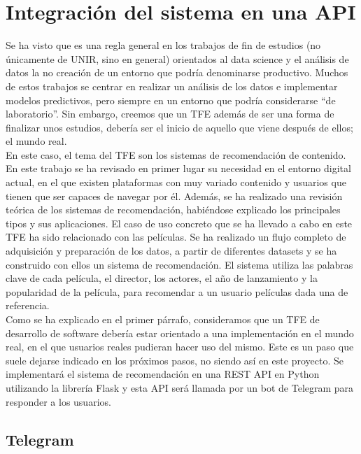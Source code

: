 \chapter{Integración del sistema en una API}\label{chap:api}

Se ha visto que es una regla general en los trabajos de fin de estudios (no únicamente de UNIR, sino en general) orientados al data science y el análisis de datos la no creación de un entorno que podría denominarse productivo. Muchos de estos trabajos se centrar en realizar un análisis de los datos e implementar modelos predictivos, pero siempre en un entorno que podría considerarse ``de laboratorio''. Sin embargo, creemos que un TFE además de ser una forma de finalizar unos estudios, debería ser el inicio de aquello que viene después de ellos; el mundo real.\\

En este caso, el tema del TFE son los sistemas de recomendación de contenido. En este trabajo se ha revisado en primer lugar su necesidad en el entorno digital actual, en el que existen plataformas con muy variado contenido y usuarios que tienen que ser capaces de navegar por él. Además, se ha realizado una revisión teórica de los sistemas de recomendación, habiéndose explicado los principales tipos y sus aplicaciones. El caso de uso concreto que se ha llevado a cabo en este TFE ha sido relacionado con las películas. Se ha realizado un flujo completo de adquisición y preparación de los datos, a partir de diferentes datasets y se ha construido con ellos un sistema de recomendación. El sistema utiliza las palabras clave de cada película, el director, los actores, el año de lanzamiento y la popularidad de la película, para recomendar a un usuario películas dada una de referencia.\\

Como se ha explicado en el primer párrafo, consideramos que un TFE de desarrollo de software debería estar orientado a una implementación en el mundo real, en el que usuarios reales pudieran hacer uso del mismo. Este es un paso que suele dejarse indicado en los próximos pasos, no siendo así en este proyecto. Se implementará el sistema de recomendación en una REST API en Python utilizando la librería Flask y esta API será llamada por un bot de Telegram para responder a los usuarios.

\section{Telegram}

